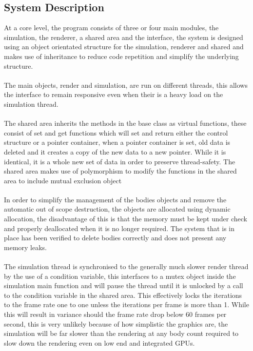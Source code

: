 \subsection{System Description}
At a core level, the program consists of three or four main modules, the simulation, the renderer, a shared area and the interface, the system is designed using an object orientated structure for the simulation, renderer and shared and makes use of inheritance to reduce code repetition and simplify the underlying structure.

\paragraph{}
The main objects, render and simulation, are run on different threads, this allows the interface to remain responsive even when their is a heavy load on the simulation thread.

\paragraph{}
The shared area inherits the methods in the base class as virtual functions, these consist of set and get functions which will set and return either the control structure or a pointer container, when a pointer container is set, old data is deleted and it creates a copy of the new data to a new pointer. While it is identical, it is a whole new set of data in order to preserve thread-safety. The shared area makes use of polymorphism to modify the functions in the shared area to include mutual exclusion object

\paragraph{}
In order to simplify the management of the bodies objects and remove the automatic out of scope destruction, the objects are allocated using dynamic allocation, the disadvantage of this is that the memory must be kept under check and properly deallocated when it is no longer required. The system that is in place has been verified to delete bodies correctly and does not present any memory leaks.

\paragraph{}
The simulation thread is synchronised to the generally much slower render thread by the use of a condition variable, this interfaces to a mutex object inside the simulation main function and will pause the thread until it is unlocked by a call to the condition variable in the shared area. This effectively locks the iterations to the frame rate one to one unless the iterations per frame is more than 1. While this will result in variance should the frame rate drop below 60 frames per second, this is very unlikely because of how simplistic the graphics are, the simulation will be far slower than the rendering at any body count required to slow down the rendering even on low end and integrated GPUs.

